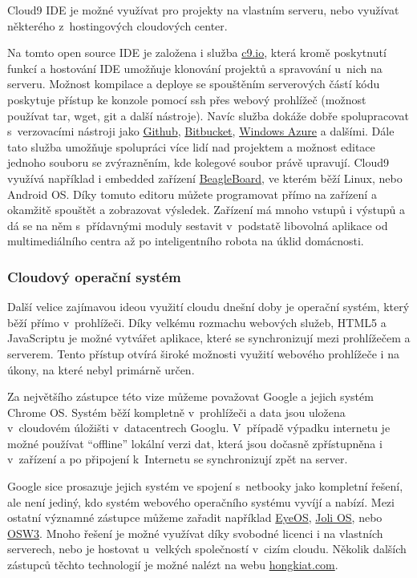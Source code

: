 Cloud9 IDE je možné využívat pro projekty na vlastním serveru, nebo využívat některého z~hostingových cloudových center.

Na tomto open source IDE je založena i služba \href{https://c9.io/}{c9.io}, která kromě poskytnutí funkcí a hostování IDE umožňuje klonování projektů a spravování u~nich na serveru. Možnost kompilace a deploye se spouštěním serverových částí kódu poskytuje přístup ke konzole pomocí ssh přes webový prohlížeč (možnost používat tar, wget, git a další nástroje). Navíc služba dokáže dobře spolupracovat s~verzovacími nástroji jako \href{https://github.com/}{Github}, \href{https://bitbucket.org/}{Bitbucket}, \href{http://www.windowsazure.com}{Windows Azure} a dalšími.
Dále tato služba umožňuje spolupráci více lidí nad projektem a možnost editace jednoho souboru se zvýrazněním, kde kolegové soubor právě upravují.
\newpage
Cloud9 využívá například i embedded zařízení \href{http://beagleboard.org/}{BeagleBoard}, ve kterém běží Linux, nebo Android OS. Díky tomuto editoru můžete programovat přímo na zařízení a okamžitě spouštět a zobrazovat výsledek. Zařízení má mnoho vstupů i výstupů a dá se na něm s~přídavnými moduly sestavit v~podstatě libovolná aplikace od multimediálního centra až po inteligentního robota na úklid domácnosti.

\subsubsection{Cloudový operační systém}
Další velice zajímavou ideou využití cloudu dnešní doby je operační systém, který běží přímo v~prohlížeči. Díky velkému rozmachu webových služeb, HTML5 a JavaScriptu je možné vytvářet aplikace, které se synchronizují mezi prohlížečem a serverem. Tento přístup otvírá široké možnosti využití webového prohlížeče i na úkony, na které nebyl primárně určen.

Za největšího zástupce této vize můžeme považovat Google a jejich systém Chrome OS. Systém běží kompletně v~prohlížeči a data jsou uložena v~cloudovém úložišti v~datacentrech Googlu. V~případě výpadku internetu je možné používat "`offline"' lokální verzi dat, která jsou dočasně zpřístupněna i v~zařízení a po připojení k~Internetu se synchronizují zpět na server.

Google sice prosazuje jejich systém ve spojení s~netbooky jako kompletní řešení, ale není jediný, kdo systém webového operačního systému vyvíjí a nabízí. Mezi ostatní významné zástupce můžeme zařadit například \href{http://www.eyeos.com/}{EyeOS}, \href{http://www.jolicloud.com/jolios}{Joli OS}, nebo \href{https://osw3.com/}{OSW3}. Mnoho řešení je možné využívat díky svobodné licenci i na vlastních serverech, nebo je hostovat u~velkých společností v~cizím cloudu. Několik dalších zástupců těchto technologií je možné nalézt na webu \href{http://www.hongkiat.com/blog/free-cloud-os/}{hongkiat.com\cite{hongkiat:webos}}.

